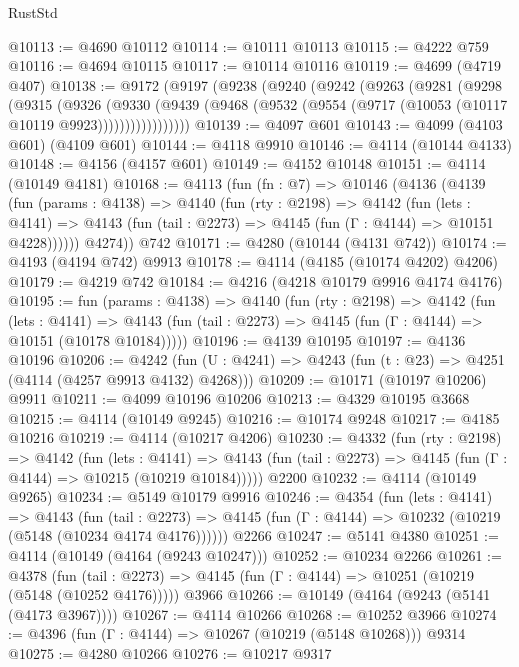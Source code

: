 \begin{lexlean}{RustStd}
\begin{coremodule}
@10113 := @4690 @10112
@10114 := @10111 @10113
@10115 := @4222 @759
@10116 := @4694 @10115
@10117 := @10114 @10116
@10119 := @4699 (@4719 @407)
@10138 := @9172
    (@9197
      (@9238
        (@9240
          (@9242
            (@9263
              (@9281
                (@9298
                  (@9315
                    (@9326
                      (@9330
                        (@9439
                          (@9468 (@9532 (@9554 (@9717 (@10053 (@10117 @10119 @9923)))))))))))))))))
@10139 := @4097 @601
@10143 := @4099 (@4103 @601) (@4109 @601)
@10144 := @4118 @9910
@10146 := @4114 (@10144 @4133)
@10148 := @4156 (@4157 @601)
@10149 := @4152 @10148
@10151 := @4114 (@10149 @4181)
@10168 := @4113
    (fun (fn : @7) =>
    @10146
      (@4136
        (@4139
          (fun (params : @4138) =>
          @4140
            (fun (rty : @2198) =>
            @4142
              (fun (lets : @4141) =>
              @4143 (fun (tail : @2273) => @4145 (fun (Γ : @4144) => @10151 @4228))))))
        @4274))
    @742
@10171 := @4280 (@10144 (@4131 @742))
@10174 := @4193 (@4194 @742) @9913
@10178 := @4114 (@4185 (@10174 @4202) @4206)
@10179 := @4219 @742
@10184 := @4216 (@4218 @10179 @9916 @4174 @4176)
@10195 := fun (params : @4138) =>
  @4140
    (fun (rty : @2198) =>
    @4142
      (fun (lets : @4141) =>
      @4143 (fun (tail : @2273) => @4145 (fun (Γ : @4144) => @10151 (@10178 @10184)))))
@10196 := @4139 @10195
@10197 := @4136 @10196
@10206 := @4242
    (fun (U : @4241) => @4243 (fun (t : @23) => @4251 (@4114 (@4257 @9913 @4132) @4268)))
@10209 := @10171 (@10197 @10206) @9911
@10211 := @4099 @10196 @10206
@10213 := @4329 @10195 @3668
@10215 := @4114 (@10149 @9245)
@10216 := @10174 @9248
@10217 := @4185 @10216
@10219 := @4114 (@10217 @4206)
@10230 := @4332
    (fun (rty : @2198) =>
    @4142
      (fun (lets : @4141) =>
      @4143 (fun (tail : @2273) => @4145 (fun (Γ : @4144) => @10215 (@10219 @10184)))))
    @2200
@10232 := @4114 (@10149 @9265)
@10234 := @5149 @10179 @9916
@10246 := @4354
    (fun (lets : @4141) =>
    @4143
      (fun (tail : @2273) =>
      @4145 (fun (Γ : @4144) => @10232 (@10219 (@5148 (@10234 @4174 @4176))))))
    @2266
@10247 := @5141 @4380
@10251 := @4114 (@10149 (@4164 (@9243 @10247)))
@10252 := @10234 @2266
@10261 := @4378
    (fun (tail : @2273) => @4145 (fun (Γ : @4144) => @10251 (@10219 (@5148 (@10252 @4176)))))
    @3966
@10266 := @10149 (@4164 (@9243 (@5141 (@4173 @3967))))
@10267 := @4114 @10266
@10268 := @10252 @3966
@10274 := @4396 (fun (Γ : @4144) => @10267 (@10219 (@5148 @10268))) @9314
@10275 := @4280 @10266
@10276 := @10217 @9317

\end{coremodule}
\end{lexlean}
